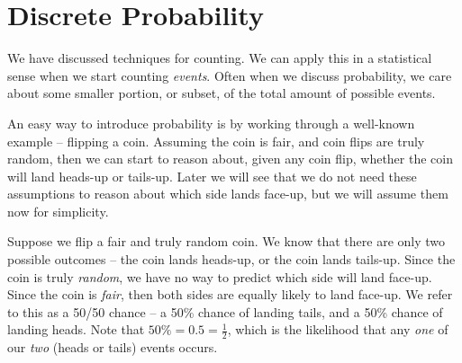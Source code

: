 \documentclass[main.tex]{subfiles}
\begin{document}

\section{Discrete Probability}

We have discussed techniques for counting. We can apply this in a statistical sense when we start counting \textit{events}. Often when we discuss probability, we care about some smaller portion, or subset, of the total amount of possible events.

An easy way to introduce probability is by working through a well-known example -- flipping a coin. Assuming the coin is fair, and coin flips are truly random, then we can start to reason about, given any coin flip, whether the coin will land heads-up or tails-up. Later we will see that we do not need these assumptions to reason about which side lands face-up, but we will assume them now for simplicity.

Suppose we flip a fair and truly random coin. We know that there are only two possible outcomes -- the coin lands heads-up, or the coin lands tails-up. Since the coin is truly \textit{random}, we have no way to predict which side will land face-up. Since the coin is \textit{fair}, then both sides are equally likely to land face-up. We refer to this as a 50/50 chance -- a 50\% chance of landing tails, and a 50\% chance of landing heads. Note that \(50\% = 0.5 = \frac{1}{2}\), which is the likelihood that any \textit{one} of our \textit{two} (heads or tails) events occurs.
\begin{center}
\end{center}
\end{document}
